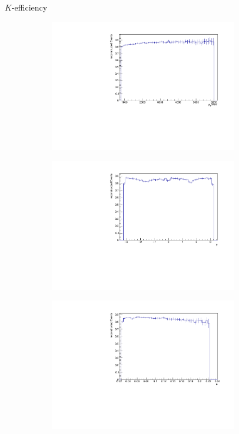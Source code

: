 \documentclass[11pt]{beamer}
\begin{document}
\begin{frame}{$K$-efficiency}
\begin{figure}
\begin{subfigure}{0.45\textwidth}
\includegraphics[width=0.9\textwidth]{up_pdf/pos/h_pt_reco_K_pos.pdf}
\end{subfigure}
\begin{subfigure}{0.45\textwidth}
\includegraphics[width=0.9\textwidth]{up_pdf/pos/h_phi_reco_K_pos.pdf}
\end{subfigure}
\begin{subfigure}{0.45\textwidth}
\includegraphics[width=0.9\textwidth]{up_pdf/pos/h_theta_reco_K_pos.pdf}

\end{subfigure}
\end{figure}
\end{frame}
\end{document}
